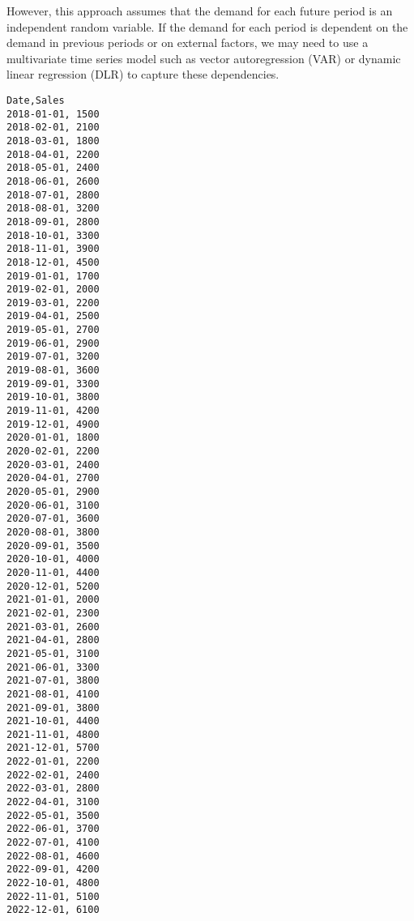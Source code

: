 However, this approach assumes that the demand for each future period is an independent random variable. If the demand for each period is dependent on the demand in previous periods or on external factors, we may need to use a multivariate time series model such as vector autoregression (VAR) or dynamic linear regression (DLR) to capture these dependencies.
\begin{verbatim}
Date,Sales
2018-01-01, 1500
2018-02-01, 2100
2018-03-01, 1800
2018-04-01, 2200
2018-05-01, 2400
2018-06-01, 2600
2018-07-01, 2800
2018-08-01, 3200
2018-09-01, 2800
2018-10-01, 3300
2018-11-01, 3900
2018-12-01, 4500
2019-01-01, 1700
2019-02-01, 2000
2019-03-01, 2200
2019-04-01, 2500
2019-05-01, 2700
2019-06-01, 2900
2019-07-01, 3200
2019-08-01, 3600
2019-09-01, 3300
2019-10-01, 3800
2019-11-01, 4200
2019-12-01, 4900
2020-01-01, 1800
2020-02-01, 2200
2020-03-01, 2400
2020-04-01, 2700
2020-05-01, 2900
2020-06-01, 3100
2020-07-01, 3600
2020-08-01, 3800
2020-09-01, 3500
2020-10-01, 4000
2020-11-01, 4400
2020-12-01, 5200
2021-01-01, 2000
2021-02-01, 2300
2021-03-01, 2600
2021-04-01, 2800
2021-05-01, 3100
2021-06-01, 3300
2021-07-01, 3800
2021-08-01, 4100
2021-09-01, 3800
2021-10-01, 4400
2021-11-01, 4800
2021-12-01, 5700
2022-01-01, 2200
2022-02-01, 2400
2022-03-01, 2800
2022-04-01, 3100
2022-05-01, 3500
2022-06-01, 3700
2022-07-01, 4100
2022-08-01, 4600
2022-09-01, 4200
2022-10-01, 4800
2022-11-01, 5100
2022-12-01, 6100
\end{verbatim}

